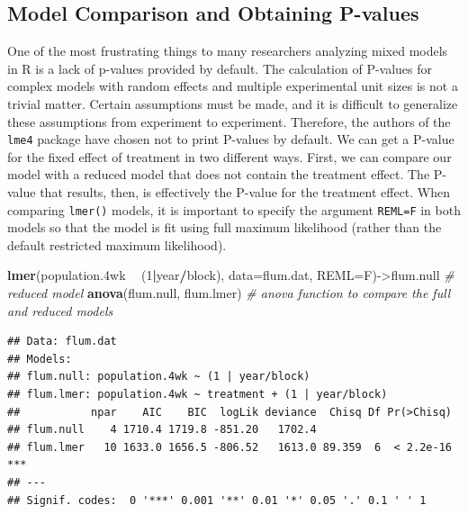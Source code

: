 \documentclass[letterpaper,]{book}
\newenvironment{Shaded}{\begin{snugshade}}{\end{snugshade}}
\newcommand{\CommentTok}[1]{\textcolor[rgb]{0.56,0.35,0.01}{\textit{#1}}}
\newcommand{\DataTypeTok}[1]{\textcolor[rgb]{0.13,0.29,0.53}{#1}}
\newcommand{\DecValTok}[1]{\textcolor[rgb]{0.00,0.00,0.81}{#1}}
\newcommand{\FloatTok}[1]{\textcolor[rgb]{0.00,0.00,0.81}{#1}}
\newcommand{\KeywordTok}[1]{\textcolor[rgb]{0.13,0.29,0.53}{\textbf{#1}}}
\newcommand{\NormalTok}[1]{#1}
\newcommand{\OperatorTok}[1]{\textcolor[rgb]{0.81,0.36,0.00}{\textbf{#1}}}
\newcommand{\StringTok}[1]{\textcolor[rgb]{0.31,0.60,0.02}{#1}}
\begin{document}
\hypertarget{model-comparison-and-obtaining-p-values}{%
\subsection{Model Comparison and Obtaining P-values}\label{model-comparison-and-obtaining-p-values}}

One of the most frustrating things to many researchers analyzing mixed models in R is a lack of p-values provided by default. The calculation of P-values for complex models with random effects and multiple experimental unit sizes is not a trivial matter. Certain assumptions must be made, and it is difficult to generalize these assumptions from experiment to experiment. Therefore, the authors of the \texttt{lme4} package have chosen not to print P-values by default. We can get a P-value for the fixed effect of treatment in two different ways. First, we can compare our model with a reduced model that does not contain the treatment effect. The P-value that results, then, is effectively the P-value for the treatment effect. When comparing \texttt{lmer()} models, it is important to specify the argument \texttt{REML=F} in both models so that the model is fit using full maximum likelihood (rather than the default restricted maximum likelihood).

\begin{Shaded}
\begin{Highlighting}[]
\KeywordTok{lmer}\NormalTok{(population}\FloatTok{.4}\NormalTok{wk }\OperatorTok{~}\StringTok{ }\NormalTok{(}\DecValTok{1}\OperatorTok{|}\NormalTok{year}\OperatorTok{/}\NormalTok{block), }\DataTypeTok{data=}\NormalTok{flum.dat, }\DataTypeTok{REML=}\NormalTok{F)->flum.null }\CommentTok{# reduced model}
\KeywordTok{anova}\NormalTok{(flum.null, flum.lmer) }\CommentTok{# anova function to compare the full and reduced models}
\end{Highlighting}
\end{Shaded}

\begin{verbatim}
## Data: flum.dat
## Models:
## flum.null: population.4wk ~ (1 | year/block)
## flum.lmer: population.4wk ~ treatment + (1 | year/block)
##           npar    AIC    BIC  logLik deviance  Chisq Df Pr(>Chisq)    
## flum.null    4 1710.4 1719.8 -851.20   1702.4                         
## flum.lmer   10 1633.0 1656.5 -806.52   1613.0 89.359  6  < 2.2e-16 ***
## ---
## Signif. codes:  0 '***' 0.001 '**' 0.01 '*' 0.05 '.' 0.1 ' ' 1
\end{verbatim}
\end{document}
